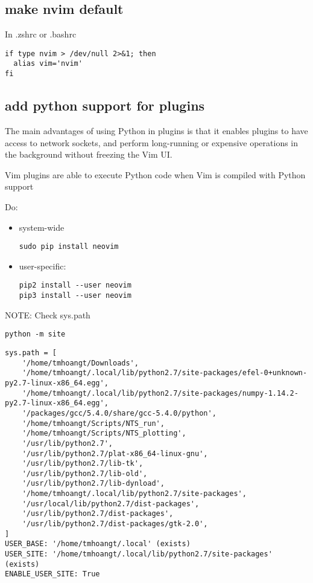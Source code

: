 \subsection{make nvim default}

In .zshrc or .bashrc
\begin{verbatim}
if type nvim > /dev/null 2>&1; then
  alias vim='nvim'
fi
\end{verbatim}

\subsection{add python support for plugins}

The main advantages of using Python in plugins is that it enables plugins to
have access to network sockets, and perform long-running or expensive operations
in the background without freezing the Vim UI.


Vim plugins are able to execute Python code when Vim is compiled with Python support

Do:
\begin{itemize}
  \item system-wide

\begin{verbatim}
sudo pip install neovim
\end{verbatim}

  \item user-specific:

\begin{verbatim}
pip2 install --user neovim
pip3 install --user neovim
\end{verbatim}
\end{itemize}

NOTE: Check sys.path
\begin{verbatim}
python -m site
\end{verbatim}
{\tiny  
\begin{verbatim}
sys.path = [
    '/home/tmhoangt/Downloads',
    '/home/tmhoangt/.local/lib/python2.7/site-packages/efel-0+unknown-py2.7-linux-x86_64.egg',
    '/home/tmhoangt/.local/lib/python2.7/site-packages/numpy-1.14.2-py2.7-linux-x86_64.egg',
    '/packages/gcc/5.4.0/share/gcc-5.4.0/python',
    '/home/tmhoangt/Scripts/NTS_run',
    '/home/tmhoangt/Scripts/NTS_plotting',
    '/usr/lib/python2.7',
    '/usr/lib/python2.7/plat-x86_64-linux-gnu',
    '/usr/lib/python2.7/lib-tk',
    '/usr/lib/python2.7/lib-old',
    '/usr/lib/python2.7/lib-dynload',
    '/home/tmhoangt/.local/lib/python2.7/site-packages',
    '/usr/local/lib/python2.7/dist-packages',
    '/usr/lib/python2.7/dist-packages',
    '/usr/lib/python2.7/dist-packages/gtk-2.0',
]
USER_BASE: '/home/tmhoangt/.local' (exists)
USER_SITE: '/home/tmhoangt/.local/lib/python2.7/site-packages' (exists)
ENABLE_USER_SITE: True
\end{verbatim}
}

